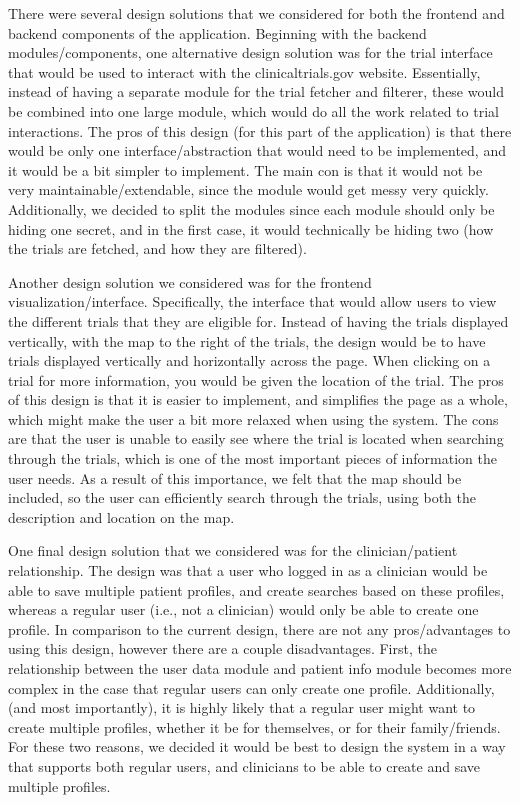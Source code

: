\documentclass[12pt, titlepage]{article}
\begin{document}
\begin{enumerate}
  There were several design solutions that we considered for both the frontend and backend components of the application.
  Beginning with the backend modules/components, one alternative design solution was for the trial interface that would be used
  to interact with the clinicaltrials.gov website. Essentially, instead of having a separate module for the trial fetcher and filterer, these 
  would be combined into one large module, which would do all the work related to trial interactions. The pros of this design (for this part 
  of the application) is that there would be only one interface/abstraction that would need to be implemented, and it would be a bit simpler to 
  implement. The main con is that it would not be very maintainable/extendable, since the module would get messy very quickly. Additionally, we 
  decided to split the modules since each module should only be hiding one secret, and in the first case, it would technically be hiding two (how the 
  trials are fetched, and how they are filtered).

  Another design solution we considered was for the frontend visualization/interface. Specifically, the interface that would allow users 
  to view the different trials that they are eligible for. Instead of having the trials displayed vertically, with the map to the right 
  of the trials, the design would be to have trials displayed vertically and horizontally across the page. When clicking on a trial 
  for more information, you would be given the location of the trial. The pros of this design is that it is easier to implement, and simplifies
  the page as a whole, which might make the user a bit more relaxed when using the system. The cons are that the user is unable to easily see where
  the trial is located when searching through the trials, which is one of the most important pieces of information the user needs. As a result of this 
  importance, we felt that the map should be included, so the user can efficiently search through the trials, using both the description
  and location on the map.

  One final design solution that we considered was for the clinician/patient relationship. The design was that a user who logged in as 
  a clinician would be able to save multiple patient profiles, and create searches based on these profiles, whereas a regular user (i.e., not a 
  clinician) would only be able to create one profile. In comparison to the current design, there are not any pros/advantages to using this design, 
  however there are a couple disadvantages. First, the relationship between the user data module and patient info module becomes more complex 
  in the case that regular users can only create one profile. Additionally, (and most importantly), it is highly likely that a regular user might 
  want to create multiple profiles, whether it be for themselves, or for their family/friends. For these two reasons, we decided it would be 
  best to design the system in a way that supports both regular users, and clinicians to be able to create and save multiple profiles.
\end{enumerate}
\end{document}
